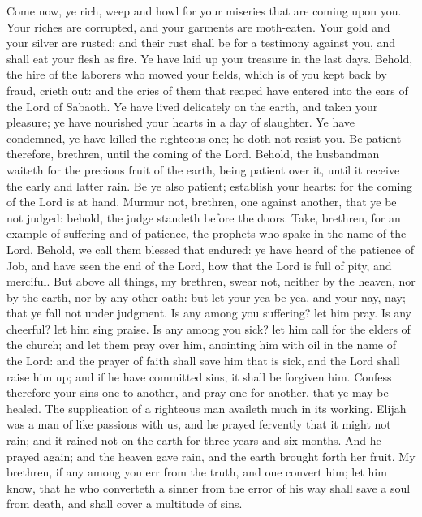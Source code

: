 Come now, ye rich, weep and howl for your miseries that are coming upon you. Your riches are corrupted, and your garments are moth-eaten. Your gold and your silver are rusted; and their rust shall be for a testimony against you, and shall eat your flesh as fire. Ye have laid up your treasure in the last days. Behold, the hire of the laborers who mowed your fields, which is of you kept back by fraud, crieth out: and the cries of them that reaped have entered into the ears of the Lord of Sabaoth. Ye have lived delicately on the earth, and taken your pleasure; ye have nourished your hearts in a day of slaughter. Ye have condemned, ye have killed the righteous one; he doth not resist you.  Be patient therefore, brethren, until the coming of the Lord. Behold, the husbandman waiteth for the precious fruit of the earth, being patient over it, until it receive the early and latter rain. Be ye also patient; establish your hearts: for the coming of the Lord is at hand. Murmur not, brethren, one against another, that ye be not judged: behold, the judge standeth before the doors. Take, brethren, for an example of suffering and of patience, the prophets who spake in the name of the Lord. Behold, we call them blessed that endured: ye have heard of the patience of Job, and have seen the end of the Lord, how that the Lord is full of pity, and merciful.  But above all things, my brethren, swear not, neither by the heaven, nor by the earth, nor by any other oath: but let your yea be yea, and your nay, nay; that ye fall not under judgment.  Is any among you suffering? let him pray. Is any cheerful? let him sing praise. Is any among you sick? let him call for the elders of the church; and let them pray over him, anointing him with oil in the name of the Lord: and the prayer of faith shall save him that is sick, and the Lord shall raise him up; and if he have committed sins, it shall be forgiven him. Confess therefore your sins one to another, and pray one for another, that ye may be healed. The supplication of a righteous man availeth much in its working. Elijah was a man of like passions with us, and he prayed fervently that it might not rain; and it rained not on the earth for three years and six months. And he prayed again; and the heaven gave rain, and the earth brought forth her fruit.  My brethren, if any among you err from the truth, and one convert him; let him know, that he who converteth a sinner from the error of his way shall save a soul from death, and shall cover a multitude of sins. 